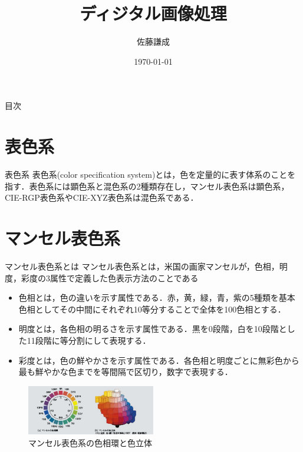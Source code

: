 \documentclass[8pt, jfont=ipaexm, t]{beamer} %
\title{ディジタル画像処理}
\institute{画像情報工学研究室}
\author{佐藤謙成}
\date{\today}
\begin{document}
\maketitle

\begin{frame}{目次}
  \tableofcontents
\end{frame}

\section{表色系}

\begin{frame}{表色系}
表色系(color specification
system)とは，色を定量的に表す体系のことを指す．表色系には顕色系と混色系の2種類存在し，マンセル表色系は顕色系，CIE-RGP表色系やCIE-XYZ表色系は混色系である．
\end{frame}

\section{マンセル表色系}

\begin{frame}{マンセル表色系とは}
マンセル表色系とは，米国の画家マンセルが，色相，明度，彩度の3属性で定義した色表示方法のことである
\begin{itemize}
\item 色相とは，色の違いを示す属性である．赤，黄，緑，青，紫の5種類を基本色相としてその中間にそれぞれ10等分することで全体を100色相とする．
\item 明度とは，各色相の明るさを示す属性である．黒を0段階，白を10段階とした11段階に等分割にして表現する．
\item 彩度とは，色の鮮やかさを示す属性である．各色相と明度ごとに無彩色から最も鮮やかな色までを等間隔で区切り，数字で表現する．
\end{itemize}
\begin{figure}[h]
  \centering
  \includegraphics[width=0.5\textwidth]{./figure/021.png}
  \caption{マンセル表色系の色相環と色立体}
\end{figure}
\end{frame}
\end{document}
